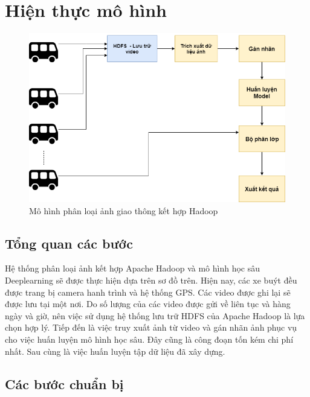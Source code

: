 \chapter{Hiện thực mô hình}

\begin{figure}[h!]
		\centering
		\includegraphics[scale=0.5]{charts/usecase.png}
		\caption{Mô hình phân loại ảnh giao thông kết hợp Hadoop}
		\label{fig:usecase}
	\end{figure}

\section{Tổng quan các bước}
	Hệ thống phân loại ảnh kết hợp Apache Hadoop và mô hình học sâu Deeplearning sẽ được thực hiện dựa trên sơ đồ trên. Hiện nay, các xe buýt đều được trang bị camera hanh trình và hệ thống GPS. Các video được ghi lại sẽ được lưu tại một nơi. Do số lượng của các video được gửi về liên tục và hàng ngày và giờ, nên việc sử dụng hệ thống lưu trữ HDFS của Apache Hadoop là lựa chọn hợp lý. Tiếp đến là việc truy xuất ảnh từ video và gán nhãn ảnh phục vụ cho việc huấn luyện mô hình học sâu. Đây cũng là công đoạn tốn kém chi phí nhất. Sau cùng là việc huấn luyện tập dữ liệu đã xây dựng.

\section{Các bước chuẩn bị}
